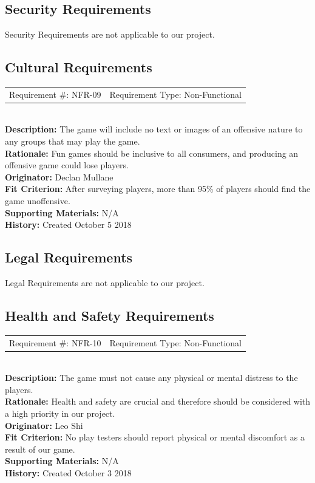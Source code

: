 \documentclass[12pt, titlepage]{article}
\begin{document}
\subsection{Security Requirements}
Security Requirements are not applicable to our project.

\subsection{Cultural Requirements}
\begin{reqbox}
	\begin{tabular}{cc}
		Requirement \#: NFR-09 & Requirement Type: Non-Functional \\
	\end{tabular} \\
	\textbf{Description:} The game will include no text or images of an offensive nature to any groups that may play the game. \\
	\textbf{Rationale:} Fun games should be inclusive to all consumers, and producing an offensive game could lose players. \\
	\textbf{Originator:} Declan Mullane\\
	\textbf{Fit Criterion:} After surveying players, more than 95\% of players should find the game unoffensive. \\
	\textbf{Supporting Materials:}  N/A\\
	\textbf{History:} Created October 5 2018
\end{reqbox}
\subsection{Legal Requirements}

Legal Requirements are not applicable to our project.

\subsection{Health and Safety Requirements}

\begin{reqbox}
	\begin{tabular}{cc}
		Requirement \#: NFR-10 & Requirement Type: Non-Functional \\
	\end{tabular} \\
	\textbf{Description:} The game must not cause any physical or mental distress to the players.\\
	\textbf{Rationale:} Health and safety are crucial and therefore should be considered with a high priority in our project.\\
	\textbf{Originator:} Leo Shi\\
	\textbf{Fit Criterion:} No play testers should report physical or mental discomfort as a result of our game. \\
	\textbf{Supporting Materials:} N/A \\
	\textbf{History:} Created October 3 2018
	
\end{reqbox}
\end{document}
